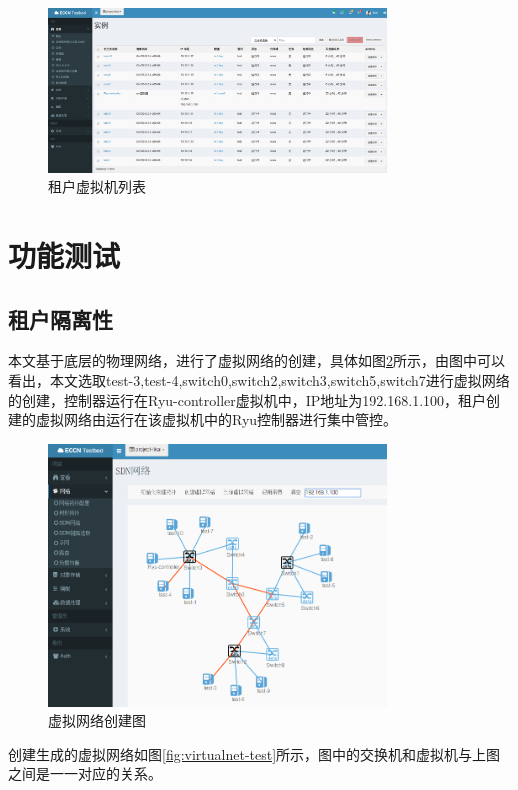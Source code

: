 \begin{figure}[!htb]
  \centering
  \includegraphics[width=0.8\textwidth]{logo/allhosts.png}
  \caption{租户虚拟机列表}
  \label{fig:allhosts}
\end{figure}
\section{功能测试}
\subsection{租户隔离性}
本文基于底层的物理网络，进行了虚拟网络的创建，具体如图\ref{fig:create-virtual}所示，由图中可以看出，本文选取test-3,test-4,switch0,switch2,switch3,switch5,switch7进行虚拟网络的创建，控制器运行在Ryu-controller虚拟机中，IP地址为192.168.1.100，租户创建的虚拟网络由运行在该虚拟机中的Ryu控制器进行集中管控。

\begin{figure}[!htb]
  \centering
  \includegraphics[width=0.8\textwidth,height=0.50\textwidth]{logo/create-virtual.png}
  \caption{虚拟网络创建图}
  \label{fig:create-virtual}
\end{figure}

创建生成的虚拟网络如图\ref{fig:virtualnet-test}所示，图中的交换机和虚拟机与上图之间是一一对应的关系。

